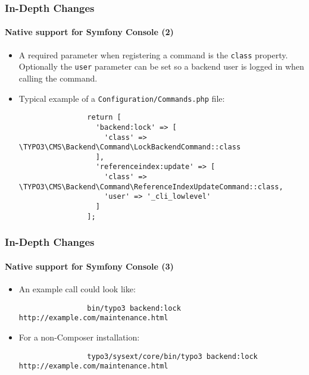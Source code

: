 \begin{frame}[fragile]
	\frametitle{In-Depth Changes}
	\framesubtitle{Native support for Symfony Console (2)}

	\lstset{basicstyle=\tiny\ttfamily}

	\begin{itemize}

		\item A required parameter when registering a command is the \texttt{class} property.
			Optionally the \texttt{user} parameter can be set so a backend user is logged
			in when calling the command.

		\item Typical example of a \texttt{Configuration/Commands.php} file:

			\begin{lstlisting}
				return [
				  'backend:lock' => [
				    'class' => \TYPO3\CMS\Backend\Command\LockBackendCommand::class
				  ],
				  'referenceindex:update' => [
				    'class' => \TYPO3\CMS\Backend\Command\ReferenceIndexUpdateCommand::class,
				    'user' => '_cli_lowlevel'
				  ]
				];
			\end{lstlisting}

	\end{itemize}

\end{frame}

\begin{frame}[fragile]
	\frametitle{In-Depth Changes}
	\framesubtitle{Native support for Symfony Console (3)}

	\lstset{basicstyle=\tiny\ttfamily}

	\begin{itemize}

		\item An example call could look like:
			\begin{lstlisting}
				bin/typo3 backend:lock http://example.com/maintenance.html
			\end{lstlisting}

		\item For a non-Composer installation:
			\begin{lstlisting}
				typo3/sysext/core/bin/typo3 backend:lock http://example.com/maintenance.html
			\end{lstlisting}

	\end{itemize}

\end{frame}


